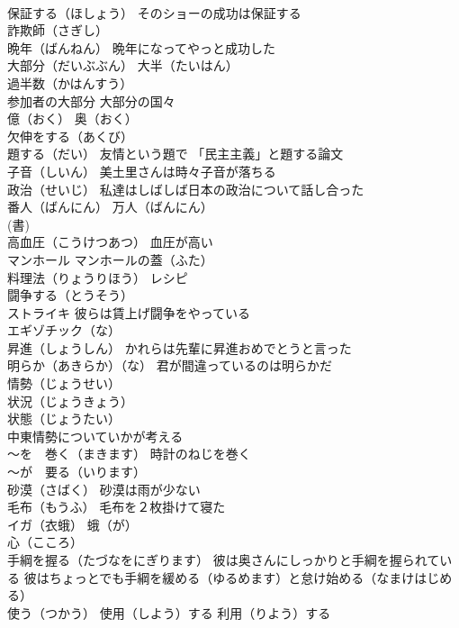 \documentclass[8pt]{extreport}
\begin{document}
\begin{CJK}{UTF8}{min}
\\	保証する（ほしょう） そのショーの成功は保証する
\\	詐欺師（さぎし）
\\	晩年（ばんねん） 晩年になってやっと成功した
\\	大部分（だいぶぶん） 大半（たいはん）
\\	過半数（かはんすう）
\\	参加者の大部分 大部分の国々
\\	億（おく） 奥（おく）
\\	欠伸をする（あくび）
\\	題する（だい） 友情という題で 「民主主義」と題する論文
\\	子音（しいん） 美土里さんは時々子音が落ちる
\\	政治（せいじ） 私達はしばしば日本の政治について話し合った
\\	番人（ばんにん） 万人（ばんにん）　
\\	(書)
\\	高血圧（こうけつあつ） 血圧が高い
\\	マンホール マンホールの蓋（ふた）
\\	料理法（りょうりほう） レシピ
\\	闘争する（とうそう）
\\	ストライキ 彼らは賃上げ闘争をやっている
\\	エギゾチック（な）
\\	昇進（しょうしん） かれらは先輩に昇進おめでとうと言った
\\	明らか（あきらか）（な） 君が間違っているのは明らかだ
\\	情勢（じょうせい） 
\\	状況（じょうきょう） 
\\	状態（じょうたい） 
\\	中東情勢についていかが考える
\\	～を　巻く（まきます） 時計のねじを巻く
\\	～が　要る（いります）
\\	砂漠（さばく） 砂漠は雨が少ない
\\	毛布（もうふ） 毛布を２枚掛けて寝た
\\	イガ（衣蛾） 蛾（が）
\\	心（こころ）
\\	手綱を握る（たづなをにぎります） 彼は奥さんにしっかりと手綱を握られている 彼はちょっとでも手綱を緩める（ゆるめます）と怠け始める（なまけはじめる）
\\	使う（つかう） 使用（しよう）する 利用（りよう）する

\end{CJK}
\end{document}
